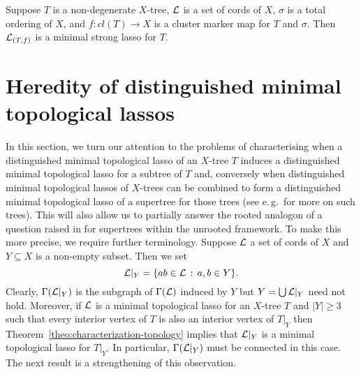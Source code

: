 \begin{cor}
  \label{corollary:strong-lasso-characterization}
  Suppose $T$ is a non-degenerate $X$-tree, ${\mathcal L}$ is a set of cords of $X$,
  $\sigma$ is a total ordering of $X$, and $f:cl(T)\to X$ is a cluster marker
  map for $T$ and $\sigma$.  Then ${\mathcal L}_{(T,f)}$ is a minimal strong lasso for
  $T$.
\end{cor}


\section{Heredity of distinguished minimal topological lassos}
\label{sec:subtree}

In this section, we turn our attention to the problems of characterising when
a distinguished minimal topological lasso of an $X$-tree $T$ induces a
distinguished minimal topological lasso for a subtree of $T$ and, conversely
when distinguished minimal topological lassos of $X$-trees can be combined to
form a distinguished minimal topological lasso of a supertree for those trees
(see e.\,g.\,\cite{BE00} for more on such trees). This will also allow us to
partially answer the rooted analogon of a question raised in \cite{DHS11} for
supertrees within the unrooted framework.  To make this more precise, we
require further terminology.  Suppose ${\mathcal L}$ a set of cords of $X$ and
$Y\subseteq X$ is a non-empty subset. Then we set
$$
{\mathcal L}|_Y=\{ab\in{\mathcal L}\,:\, a,b\in Y\}.
$$
Clearly, $\Gamma({\mathcal L}|_Y)$ is the subgraph of $\Gamma({\mathcal L})$ induced by $Y$ but
$Y=\bigcup {\mathcal L}|_Y$ need not hold. Moreover, if ${\mathcal L}$ is a minimal topological
lasso for an $X$-tree $T$ and $|Y|\geq 3$ such that every interior vertex of
$T$ is also an interior vertex of $T|_Y$ then
Theorem~\ref{theo:characterization-topology} implies that ${\mathcal L}|_Y$ is a
minimal topological lasso for $T|_Y$. In particular, $\Gamma({\mathcal L}|_Y)$ must be
connected in this case.  The next result is a strengthening of this
observation.

